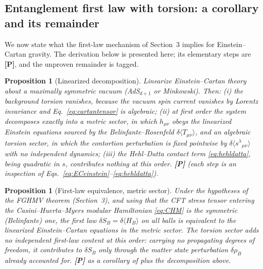 \documentclass[11pt]{article}
\newtheorem{proposition}[theorem]{Proposition}
\theoremstyle{definition}
\newcommand{\pP}{\textbf{[P]}}
\begin{document}
\subsection{Entanglement first law with torsion: a corollary and its
remainder}

We now state what the first-law mechanism of Section~3 implies for
Einstein--Cartan gravity. The derivation below is presented here; its
elementary steps are \pP{}, and the unproven remainder is tagged.

\begin{proposition}[Linearized decomposition]
Linearize Einstein--Cartan theory about a maximally symmetric vacuum
(AdS$_{d+1}$ or Minkowski). Then: (i) the background torsion vanishes,
because the vacuum spin current vanishes by Lorentz invariance and
Eq.~\eqref{eq:cartantensor} is algebraic; (ii) at first order the system
decomposes exactly into a metric sector, in which $h_{\mu\nu}$ obeys the
linearized \emph{Einstein} equations sourced by the Belinfante--Rosenfeld
$\delta\langle T_{\mu\nu}\rangle$, and an algebraic torsion sector, in which
the contortion perturbation is fixed pointwise by $\delta\langle
s^\lambda{}_{\mu\nu}\rangle$ with no independent dynamics; (iii) the
Hehl--Datta contact term \eqref{eq:hehldatta}, being quadratic in $s$,
contributes nothing at this order. \pP{} (each step is an inspection of
Eqs.~\eqref{eq:ECeinstein}--\eqref{eq:hehldatta}).
\end{proposition}

\begin{proposition}[First-law equivalence, metric sector]
Under the hypotheses of the FGHMV theorem (Section~3), and using that the
CFT stress tensor entering the Casini--Huerta--Myers modular Hamiltonian
\eqref{eq:CHM} is the symmetric (Belinfante) one, the first law
$\delta S_B=\delta\langle H_B\rangle$ on all balls is equivalent to the
linearized Einstein--Cartan equations in the metric sector. The torsion
sector adds no independent first-law content at this order: carrying no
propagating degrees of freedom, it contributes to $\delta S_B$ only through
the matter state perturbation $\delta\rho_B$ already accounted for. \pP{}
as a corollary of \cite{Faulkner2014} plus the decomposition above.
\end{proposition}
\end{document}
